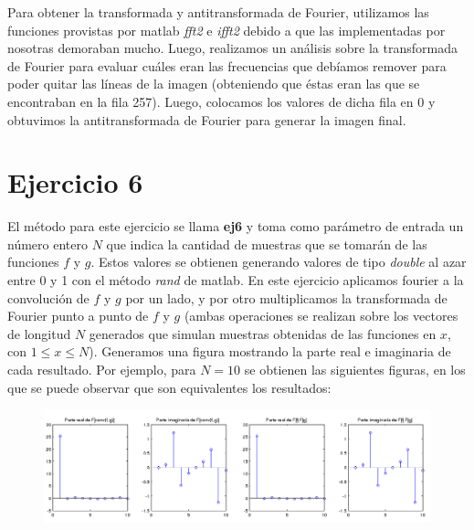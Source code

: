 \documentclass{article}
\begin{document}
Para obtener la transformada y antitransformada de Fourier, utilizamos las funciones provistas por matlab \textit{fft2} e \textit{ifft2} debido a que las implementadas por nosotras demoraban mucho. Luego, realizamos un análisis sobre la transformada de Fourier para evaluar cuáles eran las frecuencias que debíamos remover para poder quitar las líneas de la imagen (obteniendo que éstas eran las que se encontraban en la fila 257). Luego, colocamos los valores de dicha fila en 0 y obtuvimos la antitransformada de Fourier para generar la imagen final.

\section*{Ejercicio 6}

El método para este ejercicio se llama \textbf{ej6} y toma como parámetro de entrada un número entero $N$ que indica la cantidad de muestras que se tomarán de las funciones $f$ y $g$. Estos valores se obtienen generando valores de tipo \textit{double} al azar entre 0 y 1 con el método \textit{rand} de matlab. En este ejercicio aplicamos fourier a la convolución de $f$ y $g$ por un lado, y por otro multiplicamos la transformada de Fourier punto a punto de $f$ y $g$ (ambas operaciones se realizan sobre los vectores de longitud $N$ generados que simulan muestras obtenidas de las funciones en $x$, con $1\leq x \leq N$). Generamos una figura mostrando la parte real e imaginaria de cada resultado. Por ejemplo, para $N=10$ se obtienen las siguientes figuras, en los que se puede observar que son equivalentes los resultados:

\begin{figure}[H]
    \includegraphics[width=1\textwidth]{ej6.png}
\end{figure}
\end{document}
